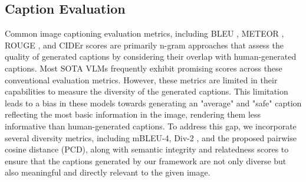 \subsection{Caption Evaluation}\label{rw:eval}
Common image captioning evaluation metrics, including BLEU \cite{bleu}, METEOR \cite{banerjee-lavie-2005-meteor}, ROUGE \cite{lin-2004-rouge}, and CIDEr \cite{cider} scores are primarily n-gram approaches that assess the quality of generated captions by considering their overlap with human-generated captions. Most SOTA VLMs frequently exhibit promising scores across these conventional evaluation metrics. However, these metrics are limited in their capabilities to measure the diversity of the generated captions. This limitation leads to a bias in these models towards generating an "average" and "safe" caption reflecting the most basic information in the image, rendering them less informative than human-generated captions. To address this gap, we incorporate several diversity metrics, including mBLEU-4, Div-2 \cite{aneja2019sequential}, and the proposed pairwise cosine distance (PCD), along with semantic integrity and relatedness scores to ensure that the captions generated by our framework are not only diverse but also meaningful and directly relevant to the given image.